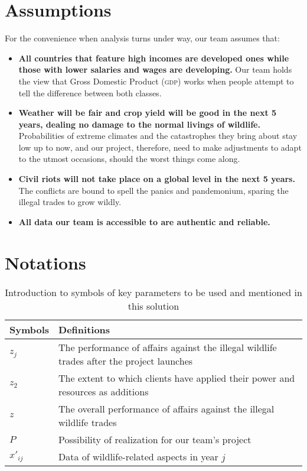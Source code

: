 \documentclass[12pt]{article}
\begin{document}
\section{Assumptions}
For the convenience when analysis turns under way, our team assumes that:
\begin{itemize}
	\item \textbf{All countries that feature high incomes are developed ones while those with lower salaries and wages are developing.} Our team holds the view that Gross Domestic Product (\textsc{gdp}) works when people attempt to tell the difference between both classes.
	\item \textbf{Weather will be fair and crop yield will be good in the next 5 years, dealing no damage to the normal livings of wildlife.} Probabilities of extreme climates and the catastrophes they bring about stay low up to now, and our project, therefore, need to make adjustments to adapt to the utmost occasions, should the worst things come along.
	\item \textbf{Civil riots will not take place on a global level in the next 5 years.} The conflicts are bound to spell the panics and pandemonium, sparing the illegal trades to grow wildly.
	\item \textbf{All data our team is accessible to are authentic and reliable.}
\end{itemize}
\section{Notations}
\begin{table}[htbp]
\centering
	\begin{tabular}{ll}
		\hline\hline
		Symbols & Definitions\\
		\hline
		$z_j$ & The performance of affairs against the illegal wildlife trades after the project launches\\
		$z_2$ & The extent to which clients have applied their power and resources as additions\\
		$z$ & The overall performance of affairs against the illegal wildlife trades\\
		$P$ &Possibility of realization for our team's project\\
		$x'_{ij}$ & Data of wildlife-related aspects in year $j$\\
		\hline\hline
	\end{tabular}
	\caption{Introduction to symbols of key parameters to be used and mentioned in this solution}
\end{table}
\clearpage
\end{document}
